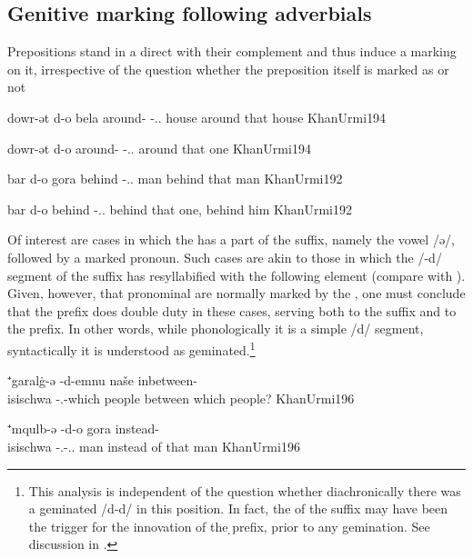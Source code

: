 \subsection{Genitive marking following adverbials}

Prepositions stand in a direct  with their complement and thus induce a \gen* marking on it, irrespective of the question whether the preposition itself is marked as \cst* or not

{dowr-ət d-o bela}
{around-\cst{} \gen-\dem.\far.\sg{} house}
{around that house}
{KhanUrmi}{194}

{dowr-ət d-o}
{around-\cst{} \gen-\dem.\far.\sg}
{around that one}
{KhanUrmi}{194}

{bar d-o gora}
{behind \gen-\dem.\far.\sg{} man}
{behind that man}
{KhanUrmi}{192}

{bar\cb{} d-o}
{behind\cb{} \gen-\dem.\far.\sg}
{behind that one, behind him}
{KhanUrmi}{192}





Of interest are cases in which the  has a part of the \cst* suffix, namely the vowel \ph/ə/, followed by a \gen* marked  pronoun. Such cases are akin to those in which the \ph/-d/ segment of the \cst* suffix has resyllabified with the following element (compare with ).  Given, however, that pronominal  are normally marked by the \gen*, one must conclude that the \d prefix does double duty in these cases, serving both to the \cst* suffix and to the \gen* prefix. In other words, while phonologically it is a simple \ph/d/ segment, syntactically it is understood as geminated.\footnote{This analysis is independent of the question whether diachronically there was a geminated \ph/d-d/ in this position. In fact, the  of the \cst* \ed suffix may have been the trigger for the innovation of the \d \gen* prefix, prior to any gemination. See discussion in .}




{⁺g\cb{}aralġ-ə -d-emnu naše}
{in\cb{}between-\\isi{schwa}{} -\cst.\gen-which people}
{between which people?}
{KhanUrmi}{196}

{⁺mqulb-ə\footnotemark{} -d-o gora}
{instead-\\isi{schwa}{} -\cst.\gen-\dem.\far.\sg{} man}
{instead of that man}
{KhanUrmi}{196}

